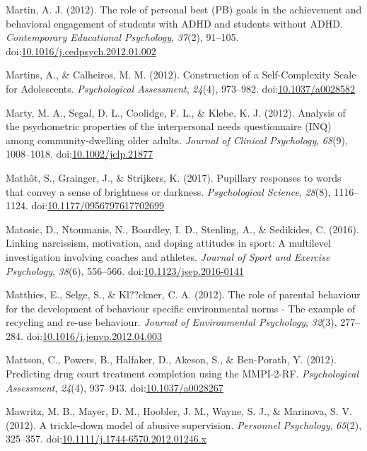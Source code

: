\documentclass[english,man]{apa6}
\theoremstyle{definition}
\theoremstyle{definition}
\theoremstyle{definition}
\theoremstyle{remark}
\begin{document}
\hypertarget{ref-Martin2012}{}
Martin, A. J. (2012). The role of personal best (PB) goals in the
achievement and behavioral engagement of students with ADHD and students
without ADHD. \emph{Contemporary Educational Psychology}, \emph{37}(2),
91--105.
doi:\href{https://doi.org/10.1016/j.cedpsych.2012.01.002}{10.1016/j.cedpsych.2012.01.002}

\hypertarget{ref-Martins2012}{}
Martins, A., \& Calheiros, M. M. (2012). Construction of a
Self-Complexity Scale for Adolescents. \emph{Psychological Assessment},
\emph{24}(4), 973--982.
doi:\href{https://doi.org/10.1037/a0028582}{10.1037/a0028582}

\hypertarget{ref-Marty2012}{}
Marty, M. A., Segal, D. L., Coolidge, F. L., \& Klebe, K. J. (2012).
Analysis of the psychometric properties of the interpersonal needs
questionnaire (INQ) among community-dwelling older adults. \emph{Journal
of Clinical Psychology}, \emph{68}(9), 1008--1018.
doi:\href{https://doi.org/10.1002/jclp.21877}{10.1002/jclp.21877}

\hypertarget{ref-Mathot2017}{}
Mathôt, S., Grainger, J., \& Strijkers, K. (2017). Pupillary responses
to words that convey a sense of brightness or darkness.
\emph{Psychological Science}, \emph{28}(8), 1116--1124.
doi:\href{https://doi.org/10.1177/0956797617702699}{10.1177/0956797617702699}

\hypertarget{ref-Matosic2016}{}
Matosic, D., Ntoumanis, N., Boardley, I. D., Stenling, A., \& Sedikides,
C. (2016). Linking narcissism, motivation, and doping attitudes in
sport: A multilevel investigation involving coaches and athletes.
\emph{Journal of Sport and Exercise Psychology}, \emph{38}(6), 556--566.
doi:\href{https://doi.org/10.1123/jsep.2016-0141}{10.1123/jsep.2016-0141}

\hypertarget{ref-Matthies2012}{}
Matthies, E., Selge, S., \& Kl??ckner, C. A. (2012). The role of
parental behaviour for the development of behaviour specific
environmental norms - The example of recycling and re-use behaviour.
\emph{Journal of Environmental Psychology}, \emph{32}(3), 277--284.
doi:\href{https://doi.org/10.1016/j.jenvp.2012.04.003}{10.1016/j.jenvp.2012.04.003}

\hypertarget{ref-Mattson2012}{}
Mattson, C., Powers, B., Halfaker, D., Akeson, S., \& Ben-Porath, Y.
(2012). Predicting drug court treatment completion using the MMPI-2-RF.
\emph{Psychological Assessment}, \emph{24}(4), 937--943.
doi:\href{https://doi.org/10.1037/a0028267}{10.1037/a0028267}

\hypertarget{ref-Mawritz2012}{}
Mawritz, M. B., Mayer, D. M., Hoobler, J. M., Wayne, S. J., \& Marinova,
S. V. (2012). A trickle-down model of abusive supervision.
\emph{Personnel Psychology}, \emph{65}(2), 325--357.
doi:\href{https://doi.org/10.1111/j.1744-6570.2012.01246.x}{10.1111/j.1744-6570.2012.01246.x}
\end{document}
